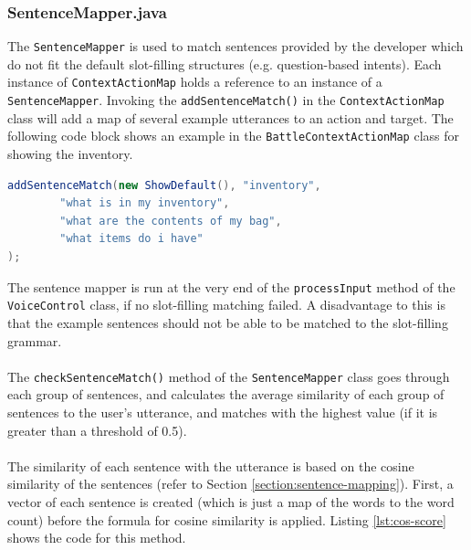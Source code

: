 \documentclass[11pt]{article}
\begin{document}
\subsubsection{SentenceMapper.java}

The \texttt{SentenceMapper} is used to match sentences provided by the developer which do not fit the default slot-filling structures (e.g. question-based intents). Each instance of \texttt{ContextActionMap} holds a reference to an instance of a \texttt{SentenceMapper}. Invoking the \texttt{addSentenceMatch()} in the \texttt{ContextActionMap} class will add a map of several example utterances to an action and target. The following code block shows an example in the \texttt{BattleContextActionMap} class for showing the inventory.

\begin{lstlisting}[language=Java]
addSentenceMatch(new ShowDefault(), "inventory",
        "what is in my inventory",
        "what are the contents of my bag",
        "what items do i have"
);
\end{lstlisting}

The sentence mapper is run at the very end of the \texttt{processInput} method of the \texttt{VoiceControl} class, if no slot-filling matching failed. A disadvantage to this is that the example sentences should not be able to be matched to the slot-filling grammar.
\\
\\
The \texttt{checkSentenceMatch()} method of the \texttt{SentenceMapper} class goes through each group of sentences, and calculates the average similarity of each group of sentences to the user's utterance, and matches with the highest value (if it is greater than a threshold of 0.5).
\\
\\
The similarity of each sentence with the utterance is based on the cosine similarity of the sentences (refer to Section \ref{section:sentence-mapping}). First, a vector of each sentence is created (which is just a map of the words to the word count) before the formula for cosine similarity is applied. Listing \ref{lst:cos-score} shows the code for this method.
\end{document}
